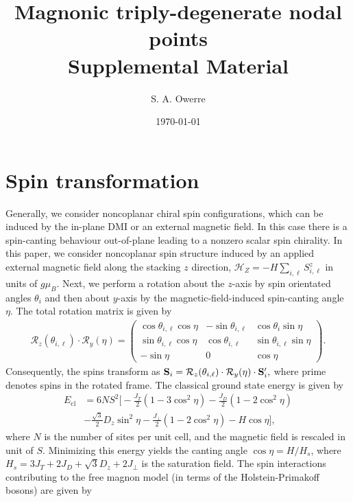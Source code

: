 \documentclass[aps,twocolumn,amsmath,amssymb, superscriptaddress]{revtex4}
\def\lb{\left(}
\def\rb{\right)}
\begin{document}
\date{\today}
\title{ Magnonic triply-degenerate nodal points\\
Supplemental Material}
\author{S. A. Owerre}


\maketitle


\section{  Spin transformation}
Generally, we consider  noncoplanar  chiral spin configurations, which can be induced by the in-plane DMI or an external  magnetic field. In this case there is a spin-canting behaviour out-of-plane leading to a nonzero scalar spin chirality.  In this paper, we consider noncoplanar spin structure induced by an applied external magnetic field along the stacking $z$ direction, $\mathcal H_Z=- H\sum_{i,\ell} S_{i,\ell}^z$ in units of $g\mu_B$. Next,  we perform a rotation about the $z$-axis  by spin orientated angles $\theta_i$ and then about $y$-axis by the magnetic-field-induced spin-canting angle $\eta$. The total rotation matrix is given by
\begin{align}
\mathcal{R}_z(\theta_{i,\ell})\cdot\mathcal{R}_y(\eta)
=\begin{pmatrix}
\cos\theta_{i,\ell}\cos\eta & -\sin\theta_{i,\ell} & \cos\theta_i\sin\eta\\
\sin\theta_{i,\ell}\cos\eta & \cos\theta_{i,\ell} &\sin\theta_{i,\ell}\sin\eta\\
-\sin\eta & 0 &\cos\eta
\end{pmatrix}.
\end{align}
 Consequently, the spins transform as $ \bold{S}_i=\mathcal{R}_z(\theta_{i,\ell})\cdot\mathcal{R}_y(\eta)\cdot\bold S_i^\prime,$
where prime denotes spins in the rotated frame. The classical ground state energy  is given by \begin{align}
E_{\text{cl}}&= 6NS^2\Big[-\frac{J_T}{2}\lb 1 - {3}\cos^2\eta\rb-\frac{J_D}{2}\lb 1 - 2\cos^2\eta\rb\\&\nonumber-\frac{\sqrt{3}}{2}D_z\sin^2\eta -\frac{J_\perp}{2}(1-2\cos^2\eta)-H\cos\eta\Big],
\end{align}
where $N$ is the number of sites per unit cell, and the magnetic field is rescaled in unit of $S$. Minimizing this energy yields the canting angle $\cos\eta = H/H_s$, where $H_s=3J_T+2J_D+\sqrt{3}D_z+ 2J_\perp$ is the saturation field. The spin interactions  contributing to the free magnon model (in terms of the  Holstein-Primakoff  bosons) are  given by
\end{document}
